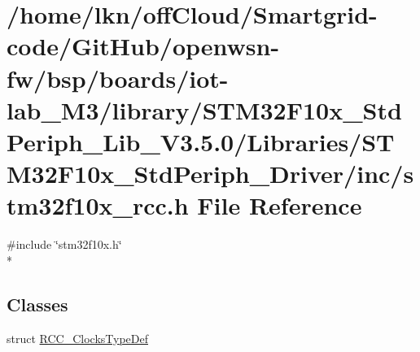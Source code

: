 \hypertarget{iot-lab___m3_2library_2_s_t_m32_f10x___std_periph___lib___v3_85_80_2_libraries_2_s_t_m32_f10x___8ff6881e8d2894e2b7edcfda7e1383f8}{}\section{/home/lkn/off\+Cloud/\+Smartgrid-\/code/\+Git\+Hub/openwsn-\/fw/bsp/boards/iot-\/lab\+\_\+\+M3/library/\+S\+T\+M32\+F10x\+\_\+\+Std\+Periph\+\_\+\+Lib\+\_\+\+V3.5.0/\+Libraries/\+S\+T\+M32\+F10x\+\_\+\+Std\+Periph\+\_\+\+Driver/inc/stm32f10x\+\_\+rcc.h File Reference}
\label{iot-lab___m3_2library_2_s_t_m32_f10x___std_periph___lib___v3_85_80_2_libraries_2_s_t_m32_f10x___8ff6881e8d2894e2b7edcfda7e1383f8}
{\ttfamily \#include \char`\"{}stm32f10x.\+h\char`\"{}}\\*
\subsection*{Classes}
\begin{DoxyCompactItemize}
\item 
struct \hyperlink{struct_r_c_c___clocks_type_def}{R\+C\+C\+\_\+\+Clocks\+Type\+Def}
\end{DoxyCompactItemize}
